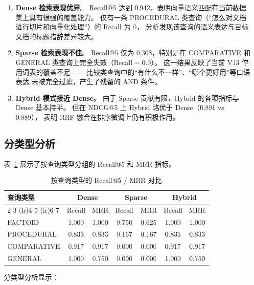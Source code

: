 \documentclass[a4paper, 12pt]{ctexart}
\begin{document}
\begin{enumerate}
  \item \textbf{Dense 检索表现优异}。
  Recall@5 达到 0.942，表明向量语义匹配在当前数据集上具有很强的覆盖能力。
  仅有一条 PROCEDURAL 类查询（``怎么对文档进行切片和向量化处理''）的 Recall 为 0，
  分析发现该查询的语义表达与目标文档的标题措辞差异较大。

  \item \textbf{Sparse 检索表现不佳}。
  Recall@5 仅为 0.308，特别是在 COMPARATIVE 和 GENERAL 类查询上完全失效（Recall = 0.0）。
  这一结果反映了当前 V13 停用词表的覆盖不足——
  比较类查询中的``有什么不一样''、``哪个更好用''等口语表达
  未被完全过滤，产生了残留的 AND 条件。

  \item \textbf{Hybrid 模式接近 Dense}。
  由于 Sparse 贡献有限，Hybrid 的各项指标与 Dense 基本持平。
  但在 NDCG@5 上 Hybrid 略优于 Dense（0.891 vs 0.889），
  表明 RRF 融合在排序微调上仍有积极作用。
\end{enumerate}

\subsection{分类型分析}

表~\ref{tab:bytype} 展示了按查询类型分组的 Recall@5 和 MRR 指标。

\begin{table}[H]
  \centering
  \caption{按查询类型的 Recall@5 / MRR 对比}
  \label{tab:bytype}
  \begin{tabular}{lcccccc}
    \toprule
    \multirow{2}{*}{查询类型} & \multicolumn{2}{c}{Dense} & \multicolumn{2}{c}{Sparse} & \multicolumn{2}{c}{Hybrid} \\
    \cmidrule(lr){2-3} \cmidrule(lr){4-5} \cmidrule(lr){6-7}
    & Recall & MRR & Recall & MRR & Recall & MRR \\
    \midrule
    FACTOID     & 1.000 & 1.000 & 0.750 & 0.625 & 1.000 & 1.000 \\
    PROCEDURAL  & 0.833 & 0.833 & 0.167 & 0.167 & 0.833 & 0.833 \\
    COMPARATIVE & 0.917 & 0.917 & 0.000 & 0.000 & 0.917 & 0.917 \\
    GENERAL     & 1.000 & 0.750 & 0.000 & 0.000 & 1.000 & 0.750 \\
    \bottomrule
  \end{tabular}
\end{table}

分类型分析显示：
\end{document}
